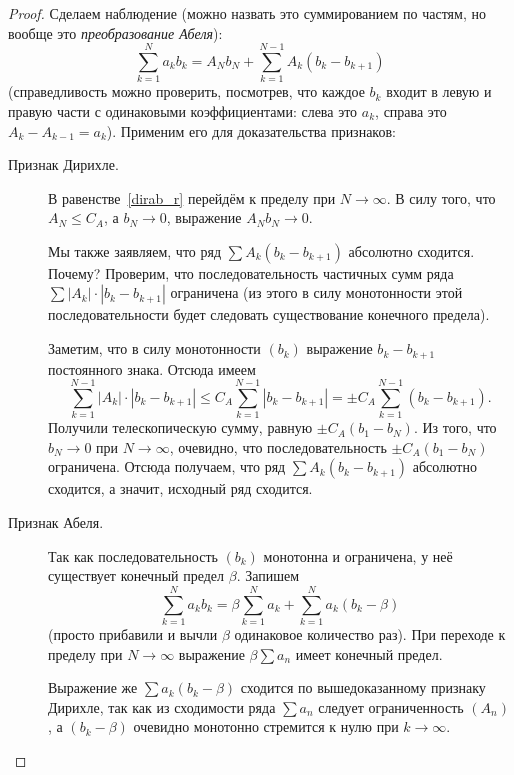 \begin{proof}
	Сделаем наблюдение (можно назвать это суммированием по частям, но вообще это \textit{преобразование Абеля}):
	\begin{equation} \label{dirab_r}
		\sum_{k=1}^N a_k b_k = A_N b_N + \sum_{k=1}^{N-1} A_k (b_k - b_{k+1})
	\end{equation}
	(справедливость можно проверить, посмотрев, что каждое \(b_k\) входит в левую и правую части с одинаковыми коэффициентами: слева это \(a_k\), справа это \(A_k - A_{k-1} = a_k\)). Применим его для доказательства признаков:
	\begin{description}
		\item[Признак Дирихле.] В равенстве~\eqref{dirab_r} перейдём к пределу при \(N \to \infty\). В силу того, что \(A_N \leqslant C_A\), а \(b_N \to 0\), выражение \(A_N b_N \to 0\).
		
		Мы также заявляем, что ряд \(\sum A_k (b_k - b_{k+1})\) абсолютно сходится. Почему? Проверим, что последовательность частичных сумм ряда  \(\sum |A_k| \cdot |b_k - b_{k+1}|\) ограничена (из этого в силу монотонности этой последовательности будет следовать существование конечного предела).
		
		Заметим, что в силу монотонности \((b_k)\) выражение \(b_k - b_{k+1}\) постоянного знака. Отсюда имеем \[
		\sum_{k=1}^{N-1} |A_k| \cdot |b_k - b_{k+1}| \leqslant C_A \sum_{k=1}^{N-1} |b_k - b_{k+1}| = \pm C_A \sum_{k=1}^{N-1} (b_k - b_{k+1}).
		\]
		Получили телескопическую сумму, равную \(\pm C_A (b_1 - b_N)\). Из того, что \(b_N \to 0\) при  \(N \to \infty\), очевидно, что последовательность \(\pm C_A (b_1 - b_N)\) ограничена. Отсюда получаем, что ряд \(\sum A_k (b_k - b_{k+1})\) абсолютно сходится, а значит, исходный ряд сходится.
		\item[Признак Абеля.] Так как последовательность \((b_k)\) монотонна и ограничена, у неё существует конечный предел \(\beta\). Запишем \[
		\sum_{k=1}^N a_k b_k = \beta \sum_{k=1}^N a_k + \sum_{k=1}^N a_k (b_k - \beta)
		\]
		(просто прибавили и вычли \(\beta\) одинаковое количество раз). При переходе к пределу при  \(N \to \infty\) выражение \(\beta \sum a_n\) имеет конечный предел.
		
		Выражение же  \(\sum a_k (b_k - \beta)\) сходится по вышедоказанному признаку Дирихле, так как из сходимости ряда \(\sum a_n\) следует ограниченность \((A_n)\), а \((b_k - \beta)\) очевидно монотонно стремится к нулю при \(k \to \infty\).
	\end{description}
\end{proof}

